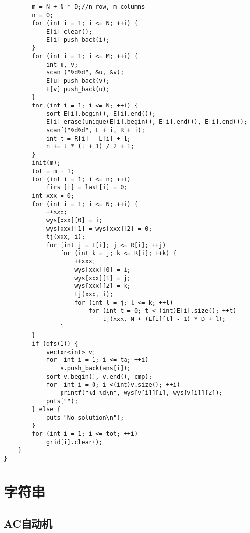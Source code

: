 \documentclass{article}
\begin{document}
\begin{lstlisting}
        m = N + N * D;//n row, m columns
        n = 0;
        for (int i = 1; i <= N; ++i) {
            E[i].clear();
            E[i].push_back(i);
        }
        for (int i = 1; i <= M; ++i) {
            int u, v;
            scanf("%d%d", &u, &v);
            E[u].push_back(v);
            E[v].push_back(u);
        }
        for (int i = 1; i <= N; ++i) {
            sort(E[i].begin(), E[i].end());
            E[i].erase(unique(E[i].begin(), E[i].end()), E[i].end());
            scanf("%d%d", L + i, R + i);
            int t = R[i] - L[i] + 1;
            n += t * (t + 1) / 2 + 1;
        }
        init(m);
        tot = m + 1;
        for (int i = 1; i <= n; ++i)
            first[i] = last[i] = 0;
        int xxx = 0;
        for (int i = 1; i <= N; ++i) {
            ++xxx;
            wys[xxx][0] = i;
            wys[xxx][1] = wys[xxx][2] = 0;
            tj(xxx, i);
            for (int j = L[i]; j <= R[i]; ++j)
                for (int k = j; k <= R[i]; ++k) {
                    ++xxx;
                    wys[xxx][0] = i;
                    wys[xxx][1] = j;
                    wys[xxx][2] = k;
                    tj(xxx, i);
                    for (int l = j; l <= k; ++l)
                        for (int t = 0; t < (int)E[i].size(); ++t)
                            tj(xxx, N + (E[i][t] - 1) * D + l);
                }
        }
        if (dfs(1)) {
            vector<int> v;
            for (int i = 1; i <= ta; ++i)
                v.push_back(ans[i]);
            sort(v.begin(), v.end(), cmp);
            for (int i = 0; i <(int)v.size(); ++i)
                printf("%d %d\n", wys[v[i]][1], wys[v[i]][2]);
            puts("");
        } else {
            puts("No solution\n");
        }
        for (int i = 1; i <= tot; ++i)
            grid[i].clear();
    }
}
\end{lstlisting}

\section{字符串}

\subsection{AC自动机}
\end{document}
